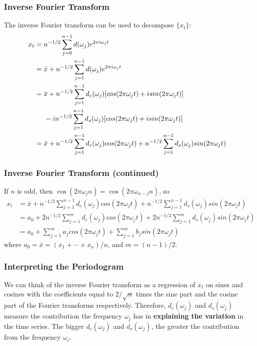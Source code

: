 \documentclass[%
xcolor=pdftex]{beamer}
\begin{document}
\begin{frame}
\frametitle{Inverse Fourier Transform}

The inverse Fourier transform can be used to decompose $\{x_t\}$:
\begin{align*}
x_t &= n^{-1/2} \sum_{j=0}^{n-1} d(\omega_j) e^{2 \pi i \omega_j t} \\
&= \bar{x} + n^{-1/2} \sum_{j=1}^{n-1} d(\omega_j) e^{2 \pi i \omega_j t}   \\
&= \bar{x} + n^{-1/2} \sum_{j=1}^{n-1} d_c(\omega_j)[ cos(2 \pi  \omega_j t)+ i sin(2 \pi  \omega_j t)] \\
&\hspace{5mm}  - i n^{-1/2} \sum_{j=1}^{n-1} d_s(\omega_j) [ cos(2 \pi  \omega_j t)+ i sin(2 \pi  \omega_j t)] \\
&= \bar{x} + n^{-1/2} \sum_{j=1}^{n-1} d_c(\omega_j)cos(2 \pi  \omega_j t)  + n^{-1/2} \sum_{j=1}^{n-1} d_s(\omega_j) sin(2 \pi  \omega_j t) 
\end{align*}

\end{frame}


\begin{frame}
\frametitle{Inverse Fourier Transform (continued)}

If $n$ is odd, then $\cos(2\pi \omega_j n) = \cos(2\pi \omega_{n-j} n)$, so 
\begin{align*}
x_t 
&= \bar{x} + n^{-1/2} \sum_{j=1}^{n-1} d_c(\omega_j)cos(2 \pi  \omega_j t)  + n^{-1/2} \sum_{j=1}^{n-1} d_s(\omega_j) sin(2 \pi  \omega_j t)  \\
&= a_0 + 2 n^{-1/2} \sum_{j=1}^{m} d_c(\omega_j)cos(2 \pi  \omega_j t)  + 2n^{-1/2} \sum_{j=1}^{m} d_s(\omega_j) sin(2 \pi  \omega_j t)  \\
&= a_0 +  \sum_{j=1}^{m} a_j cos(2 \pi  \omega_j t)  + \sum_{j=1}^{m} b_j sin(2 \pi  \omega_j t)  
\end{align*}
where $a_0=\bar{x}=(x_1+\cdots+x_n)/n$, and $m=(n-1)/2$.

\end{frame}



\begin{frame}
\frametitle{Interpreting the Periodogram}

We can think of the inverse Fourier transform as a
regression of $x_t$ on  sines and cosines with the coefficients
equal to $2/\sqrt{n}$ times the sine part and the cosine part
of the Fourier transforms respectively. Therefore,
$d_c(\omega_j)$ and $d_s(\omega_j)$ measure the contribution the frequency $\omega_j$ has in \textbf{explaining the variation} in
the time series. The bigger $d_c(\omega_j)$ and
$d_s(\omega_j)$, the greater the contribution from the
frequency $\omega_j$.

\end{frame}
\end{document}
